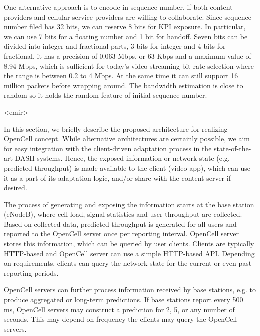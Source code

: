 One alternative approach is to encode in sequence number, if both content providers and cellular service providers are willing to collaborate. Since sequence number filed has 32 bits, we can reserve 8 bits for KPI exposure. In particular, we can use 7 bits for a floating number and 1 bit for handoff. Seven bits can be divided into integer and fractional parts, 3 bits for integer and 4 bits for fractional, it has a precision of 0.063 Mbps, or 63 Kbps and a maximum value of 8.94 Mbps, which is sufficient for today's video streaming bit rate selection where the range is between 0.2 to 4 Mbps.
At the same time it can still support 16 million packets before wrapping around. The bandwidth estimation is close to random so it holds the random feature of initial sequence number.



<emir>

In this section, we briefly describe the proposed architecture for realizing OpenCell concept. While alternative architectures are certainly possible, we aim for easy integration with the client-driven adaptation process in the state-of-the-art DASH systems. Hence, the exposed information or network state (e.g. predicted throughput) is made available to the client (video app), which can use it as a part of its adaptation logic, and/or share with the content server if desired.

The process of generating and exposing the information starts at the base station (eNodeB), where cell load, signal statistics and user throughput are collected. Based on collected data, predicted throughput is generated for all users and reported to the OpenCell server once per reporting interval. OpenCell server stores this information, which can be queried by user clients. Clients are typically HTTP-based and OpenCell server can use a simple HTTP-based API. Depending on requirements, clients can query the network state for the current or even past reporting periods. 

OpenCell servers can further process information received by base stations, e.g. to produce aggregated or long-term predictions. If base stations report every 500 ms, OpenCell servers may construct a prediction for 2, 5, or any number of seconds. This may depend on frequency the clients may query the OpenCell servers. 


